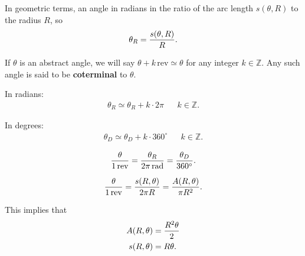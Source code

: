 \begin{remark}

In geometric terms, an angle in radians in the ratio of the arc length
\(s(\theta, R)\) to the radius \(R\), so
\begin{align*}
\theta_R = {s(\theta, R) \over R}
.\end{align*}

\end{remark}

\begin{definition}

If \(\theta\) is an abstract angle, we will say
\(\theta + k\,\text{rev} \simeq \theta\) for any integer
\(k\in {\mathbb{Z}}\). Any such angle is said to be \textbf{coterminal}
to \(\theta\).

\end{definition}

\begin{remark}

In radians:
\begin{align*}
\theta_R \simeq \theta_R + k\cdot 2\pi && k\in {\mathbb{Z}}
.\end{align*}

In degrees:
\begin{align*}
\theta_D \simeq \theta_D + k\cdot 360^\circ && k\in {\mathbb{Z}}
.\end{align*}

\end{remark}

\begin{proposition}


\begin{align*}
{\theta \over 1\,\text{rev}} = {\theta_R \over 2\pi\, \text{rad} } = {\theta_D \over 360^\circ}
.\end{align*}

\end{proposition}

\begin{proposition}


\begin{align*}
{\theta \over 1\,\text{rev}}
= 
{s(R, \theta) \over 2\pi R} 
= 
{ A(R, \theta) \over \pi R^2 }
.\end{align*}

This implies that
\begin{align*}
A(R, \theta) &={R^2 \theta \over 2} \\
s(R, \theta) &= R\theta
.\end{align*}

\end{proposition}

